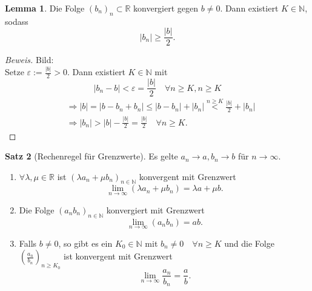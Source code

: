 \documentclass[12pt,a4paper,titlepage]{article} %
\theoremstyle{definition}
\newtheorem{satz}{Satz}[subsection]
\newtheorem{lem}[satz]{Lemma}
\theoremstyle{remark}
\newenvironment{bew}{\begin{proof}[Beweis]}{\end{proof}}
\newcommand{\N}{\mathbb{N}}
\newcommand{\R}{\mathbb{R}}
\newcommand{\limes}[1]{\lim\limits_{#1\rightarrow\infty}}
\begin{document}
\begin{lem}
	Die Folge $(b_n)_n \subset \R$ konvergiert gegen $b\neq 0$. Dann existiert $K\in\N$, sodass 
	$$|b_n| \geq \frac{|b|}{2}.$$
\end{lem}
\begin{bew}
	Bild: \\%
	Setze $\varepsilon := \frac{|b|}{2}>0$. Dann existiert $K\in\N$ mit $$|b_n-b| < \varepsilon = \frac{|b|}{2} \quad\forall n\geq K, n\geq K$$
	\begin{align*}
		&\Rightarrow |b| = |b-b_n + b_n| \leq |b-b_n| + |b_n| \overset{n\geq K}{<} \frac{|b|}{2} + |b_n|\\
		&\Rightarrow |b_n| > |b| - \frac{|b|}{2} = \frac{|b|}{2} \quad \forall n\geq K.
	\end{align*}
\end{bew}
\begin{satz}[Rechenregel für Grenzwerte]
	Es gelte $a_n\rightarrow a, b_n \rightarrow b$ für $n\rightarrow\infty$.
	\begin{enumerate}
		\item $\forall \lambda, \mu \in\R$ ist $(\lambda a_n + \mu b_n)_{n\in\N}$ konvergent mit Grenzwert $$\limes{n} (\lambda a_n + \mu b_n) = \lambda a + \mu b.$$
		\item Die Folge $(a_nb_n)_{n\in\N}$ konvergiert mit Grenzwert $$\limes{n} (a_nb_n) = ab.$$
		\item Falls $b\neq 0$, so gibt es ein $K_0 \in\N$ mit $b_n \neq 0 \quad \forall n\geq K$ und die Folge $\left(\frac{a_n}{b_n}\right)_{n\geq K_0}$ ist konvergent mit Grenzwert $$\limes{n} \frac{a_n}{b_n} = \frac{a}{b}.$$
	\end{enumerate}
\end{satz}
\end{document}
